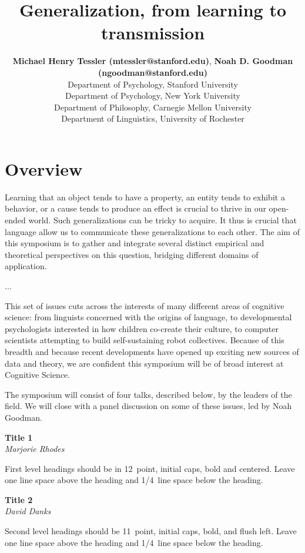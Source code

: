 \documentclass[10pt,letterpaper]{article}
\title{Generalization, from learning to transmission}
\author{{\large \bf Michael Henry Tessler (mtessler@stanford.edu)}, {\large \bf Noah D. Goodman (ngoodman@stanford.edu)}  \\
  Department of Psychology, Stanford University
  \AND {\large \bf Marjorie Rhodes (marjorie.rhodes@nyu.edu)} \\
  Department of Psychology, New York University
   \AND {\large \bf David Danks (ddanks@cmu.edu)} \\
  Department of Philosophy, Carnegie Mellon University
    \AND {\large \bf Gregory Carlson (calrson@ling.rochester.edu)} \\
  Department of Linguistics, University of Rochester
  }
\begin{document}
\maketitle


\section{Overview}

Learning that an object tends to have a property, an entity tends to exhibit a behavior, or a cause tends to produce an effect is crucial to thrive in our open-ended world. 
Such generalizations can be tricky to acquire.
It thus is crucial that language allow us to communicate these generalizations to each other.
The aim of this symposium is to gather and integrate several distinct empirical and theoretical perspectives on this question, bridging different domains of application.

...

This set of issues cuts across the interests of many different areas of cognitive science: from linguists concerned with the origins of language, to developmental psychologists interested in how children co-create their culture, to computer scientists attempting to build self-sustaining robot collectives. 
Because of this breadth and because recent developments have opened up exciting new sources of data and theory, we are confident this symposium will be of broad interest at Cognitive Science.

The symposium will consist of four talks, described below, by the leaders of the field.
We will close with a panel discussion on some of these issues, led by Noah Goodman.

\noindent\textbf{Title 1} \\
\noindent\emph{Marjorie Rhodes}

First level headings should be in 12~point, initial caps, bold and
centered. Leave one line space above the heading and 1/4~line space
below the heading.

\noindent\textbf{Title 2} \\
\noindent\emph{David Danks}

Second level headings should be 11~point, initial caps, bold, and
flush left. Leave one line space above the heading and 1/4~line
space below the heading.
\end{document}
